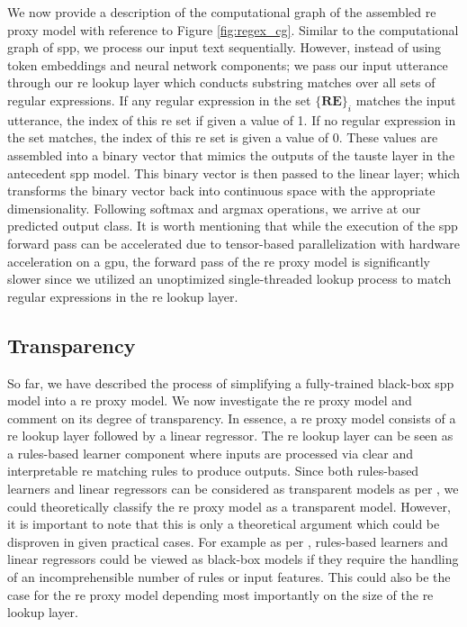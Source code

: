 We now provide a description of the computational graph of the assembled \ac{re}
proxy model with reference to Figure \ref{fig:regex_cg}. Similar to the
computational graph of \ac{spp}, we process our input text sequentially.
However, instead of using token embeddings and neural network components; we
pass our input utterance through our \ac{re} lookup layer which conducts
substring matches over all sets of regular expressions. If any regular
expression in the set $\{\textbf{RE}\}_i$ matches the input utterance, the index of
this \ac{re} set if given a value of 1. If no regular expression in the set
matches, the index of this \ac{re} set is given a value of 0. These values are
assembled into a binary vector that mimics the outputs of the \ac{tauste} layer
in the antecedent \ac{spp} model. This binary vector is then passed to the
linear layer; which transforms the binary vector back into continuous space with
the appropriate dimensionality. Following softmax and argmax operations, we
arrive at our predicted output class. It is worth mentioning that while the
execution of the \ac{spp} forward pass can be accelerated due to tensor-based
parallelization with hardware acceleration on a \ac{gpu}, the forward pass of
the \ac{re} proxy model is significantly slower since we utilized an unoptimized
single-threaded lookup process to match regular expressions in the \ac{re}
lookup layer.

\subsection{Transparency}

\label{section:re_transparency}

So far, we have described the process of simplifying a fully-trained black-box
\ac{spp} model into a \ac{re} proxy model. We now investigate the \ac{re} proxy model and
comment on its degree of transparency. In essence, a \ac{re} proxy model consists of
a \ac{re} lookup layer followed by a linear regressor. The \ac{re} lookup layer can be
seen as a rules-based learner component where inputs are processed via clear and
interpretable \ac{re} matching rules to produce outputs. Since both rules-based
learners and linear regressors can be considered as transparent models as per
\citet[Page 7, Section 3]{arrieta2020explainable}, we could theoretically
classify the \ac{re} proxy model as a transparent model. However, it is important to
note that this is only a theoretical argument which could be disproven in given
practical cases. For example as per \citet[Page 9, Table
2]{arrieta2020explainable}, rules-based learners and linear regressors could be
viewed as black-box models if they require the handling of an incomprehensible
number of rules or input features. This could also be the case for the \ac{re} proxy
model depending most importantly on the size of the \ac{re} lookup layer.

